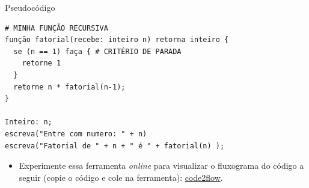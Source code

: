 \documentclass[12pt,a4paper]{article}
\providecommand{\tightlist}{%
      \setlength{\itemsep}{0pt}\setlength{\parskip}{0pt}}
\begin{document}
    Pseudocódigo

\begin{verbatim}
# MINHA FUNÇÃO RECURSIVA
função fatorial(recebe: inteiro n) retorna inteiro {
  se (n == 1) faça { # CRITÉRIO DE PARADA
    retorne 1
  }
  retorne n * fatorial(n-1);
}

Inteiro: n;
escreva("Entre com numero: " + n)
escreva("Fatorial de " + n + " é " + fatorial(n) );
\end{verbatim}

    \begin{itemize}
\tightlist
\item
  Experimente essa ferramenta \emph{online} para visualizar o fluxograma
  do código a seguir (copie o código e cole na ferramenta):
  \href{https://app.code2flow.com/}{code2flow}.
\end{itemize}
\end{document}
